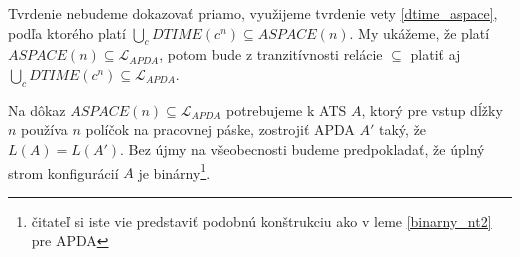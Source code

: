 \begin{dokaz}
  Tvrdenie nebudeme dokazovať priamo, využijeme tvrdenie vety
  \ref{dtime_aspace}, podľa ktorého platí $\underset{c}{\bigcup}
  DTIME(c^n)\subseteq ASPACE(n)$. My ukážeme, že platí
  $ASPACE(n)\subseteq\mathcal{L}_{APDA}$, potom bude z tranzitívnosti
  relácie $\subseteq$ platiť aj
  $\underset{c}{\bigcup}DTIME(c^n)\subseteq\mathcal{L}_{APDA}$.

  \smallskip
  Na dôkaz $ASPACE(n)\subseteq\mathcal{L}_{APDA}$ potrebujeme k
  ATS $A$, ktorý pre vstup dĺžky $n$ používa $n$ políčok na
  pracovnej páske, zostrojiť APDA $A'$ taký, že
  $L(A)=L(A')$. Bez újmy na všeobecnosti budeme predpokladať, že
  úplný strom konfigurácií $A$ je binárny\footnote{čitateľ si
  iste vie predstaviť podobnú konštrukciu ako v leme
  \ref{binarny_nt2} pre APDA}.


\end{dokaz}
